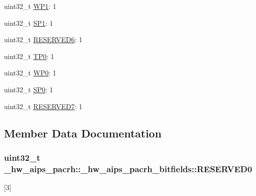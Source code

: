 \begin{DoxyCompactItemize}
\item 
uint32\+\_\+t \hyperlink{struct__hw__aips__pacrh_1_1__hw__aips__pacrh__bitfields_a5f40aac855273e39c4914f15805c755b}{W\+P1}\+: 1
\item 
uint32\+\_\+t \hyperlink{struct__hw__aips__pacrh_1_1__hw__aips__pacrh__bitfields_acea05c0ce2b1be293a00f490ca95f79b}{S\+P1}\+: 1
\item 
uint32\+\_\+t \hyperlink{struct__hw__aips__pacrh_1_1__hw__aips__pacrh__bitfields_a71ced7e7d81cb4913e2b10efbf4bae70}{R\+E\+S\+E\+R\+V\+E\+D6}\+: 1
\item 
uint32\+\_\+t \hyperlink{struct__hw__aips__pacrh_1_1__hw__aips__pacrh__bitfields_a49bd5656697941dd7d8c68669e77c56f}{T\+P0}\+: 1
\item 
uint32\+\_\+t \hyperlink{struct__hw__aips__pacrh_1_1__hw__aips__pacrh__bitfields_ae630ce8957aebca19118558d35e3ab7d}{W\+P0}\+: 1
\item 
uint32\+\_\+t \hyperlink{struct__hw__aips__pacrh_1_1__hw__aips__pacrh__bitfields_a2e347e6145c3adb6dd0b282cf7b4b4d3}{S\+P0}\+: 1
\item 
uint32\+\_\+t \hyperlink{struct__hw__aips__pacrh_1_1__hw__aips__pacrh__bitfields_aee3f60eda409fb13e70a9bf48c2a0b96}{R\+E\+S\+E\+R\+V\+E\+D7}\+: 1
\end{DoxyCompactItemize}


\subsection{Member Data Documentation}
\subsubsection[{\texorpdfstring{R\+E\+S\+E\+R\+V\+E\+D0}{RESERVED0}}]{\setlength{\rightskip}{0pt plus 5cm}uint32\+\_\+t \+\_\+hw\+\_\+aips\+\_\+pacrh\+::\+\_\+hw\+\_\+aips\+\_\+pacrh\+\_\+bitfields\+::\+R\+E\+S\+E\+R\+V\+E\+D0}\hypertarget{struct__hw__aips__pacrh_1_1__hw__aips__pacrh__bitfields_af7fa79a0584de951f2fa64b9953a5757}{}\label{struct__hw__aips__pacrh_1_1__hw__aips__pacrh__bitfields_af7fa79a0584de951f2fa64b9953a5757}
\mbox{[}3\mbox{]} 

